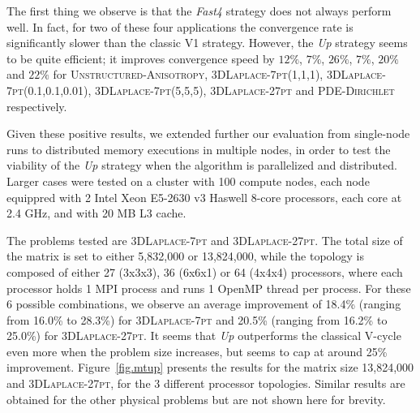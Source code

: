 The first thing we observe is that the \emph{Fast4} strategy does not
always perform well. In fact, for two of these four applications the
convergence rate is significantly slower than the classic V1 strategy.
However, the \emph{Up} strategy seems to be quite efficient; it improves
convergence speed by $12\%$, $7\%$, $26\%$, $7\%$, $20\%$ and $22\%$ for
\textsc{Unstructured-Anisotropy}, \textsc{3DLaplace-7pt(1,1,1)}, \textsc{3DLaplace-7pt(0.1,0.1,0.01)}, \textsc{3DLaplace-7pt(5,5,5)},
\textsc{3DLaplace-27pt} and \textsc{PDE-Dirichlet} respectively.

Given these positive results, we extended further our evaluation from
single-node runs to distributed memory executions in multiple nodes, in order to test
the viability of the \emph{Up} strategy when the algorithm is parallelized and
distributed. Larger cases were tested on a cluster with 100 compute nodes,
each node equippred with 2 Intel Xeon E5-2630 v3 Haswell 8-core processors,
each core at 2.4 GHz, and with 20 MB L3 cache.

The problems tested are \textsc{3DLaplace-7pt} and
\textsc{3DLaplace-27pt}.
The total size of the matrix is set to either 5,832,000 or 13,824,000, while
the topology is composed of either 27 (3x3x3), 36 (6x6x1) or 64 (4x4x4)
processors, where each processor holds 1 MPI process and runs 1 OpenMP
thread per process.
For these 6 possible combinations, we observe an
average improvement of 18.4\% (ranging from 16.0\% to 28.3\%) for
\textsc{3DLaplace-7pt} and 20.5\% (ranging from 16.2\% to 25.0\%) for
\textsc{3DLaplace-27pt}. It seems that \emph{Up} outperforms the
classical V-cycle even more when the problem size increases, but seems to cap at around
25\% improvement. Figure~\ref{fig.mtup} presents the results for the matrix
size 13,824,000 and \textsc{3DLaplace-27pt}, for the 3 different processor
topologies. Similar results are obtained for the other physical problems but are not
shown here for brevity.

